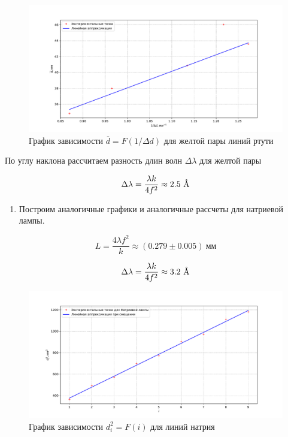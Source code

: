 \documentclass[a4paper,12pt]{article}
\begin{document}
\FloatBarrier
\begin{figure}[!h]
    \centering
    \includegraphics[scale=0.65]{graph_yellow.pdf}
    \caption{График зависимости $\overline{d} = F(1/\Delta d)$ для желтой пары линий ртути}
    \label{graph:2}
\end{figure}
\FloatBarrier

По углу наклона рассчитаем разность длин волн $\Delta \lambda$ для желтой пары

\begin{equation*}
    \Delta \lambda = \frac{\lambda k}{4 f^2} \approx 2.5 \ \text{\si{\angstrom}}
\end{equation*}

\begin{enumerate}[resume]
    \item Построим аналогичные графики и аналогичные рассчеты для натриевой лампы.
\end{enumerate}

\begin{equation*}
    L = \frac{4\lambda f^2}{k} \approx (0.279 \pm 0.005) \ \text{мм}
\end{equation*}

\begin{equation*}
    \Delta \lambda = \frac{\lambda k}{4 f^2} \approx 3.2 \ \text{\si{\angstrom}}
\end{equation*}

\FloatBarrier
\begin{figure}[!h]
    \centering
    \includegraphics[scale=0.65]{graph_na_1.pdf}
    \caption{График зависимости $d_i^2 = F(i)$ для линий натрия}
    \label{graph:3}
\end{figure}
\FloatBarrier
\end{document}

